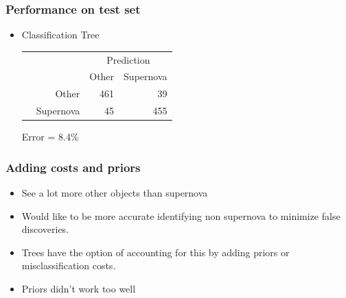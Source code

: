 \documentclass{beamer}
\begin{document}
	\begin{frame}
		\frametitle{Performance on test set}
		\begin{itemize}
			\item{Classification Tree
			\begin{table}
			\begin{tabular}{cr|rr}
			& & \multicolumn{2}{c}{Prediction}\\
			& & Other & Supernova\\
			\hline
			\multirow{2}{*}{\rotatebox{90}{Actual}} & Other &  461 &  39\\
			& Supernova & 45 &  455\\
			\end{tabular}
			\end{table}
			Error = 8.4\%}
		\end{itemize}
\end{frame}


\begin{frame}
	\frametitle{Adding costs and priors}
	\begin{itemize}
		\item See a lot more other objects than supernova
		\item Would like to be more accurate identifying non supernova to minimize false discoveries.
		\item Trees have the option of accounting for this by adding priors or misclassification costs.
		\item Priors didn't work too well
	\end{itemize}
\end{frame}
\end{document}
